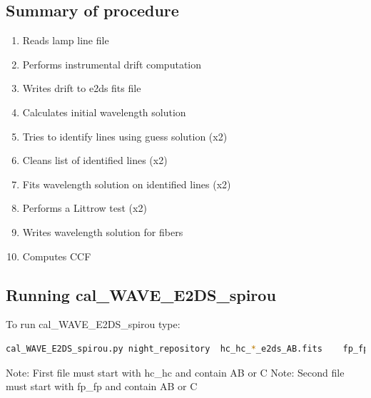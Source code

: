 \subsection{Summary of procedure}
\begin{enumerate}
	\item Reads lamp line file
	\item Performs instrumental drift computation
	\item Writes drift to e2ds fits file
	\item Calculates initial wavelength solution
	\item Tries to identify lines using guess solution (x2) 
	\item Cleans list of identified lines (x2)
	\item Fits wavelength solution on identified lines (x2)
	\item Performs a Littrow test (x2)
	\item Writes wavelength solution for fibers
	\item Computes CCF
\end{enumerate}

\subsection{Running cal\_WAVE\_E2DS\_spirou}

To run cal\_WAVE\_E2DS\_spirou type:
\begin{lstlisting}[language=bash, style=bashstyle]
cal_WAVE_E2DS_spirou.py night_repository  hc_hc_*_e2ds_AB.fits    fp_fp_*_e2ds_AB.fits 
\end{lstlisting}

\noindent Note: First file must start with hc\_hc and contain AB or C
\noindent Note: Second file must start with fp\_fp and contain AB or C





